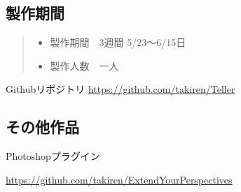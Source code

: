 \documentclass[12pt,a4paper,uplatex,dvipdfmx]{jsarticle}
\begin{document}
\subsection{製作期間}
\begin{quote}
  \begin{itemize}
    \item 製作期間　3週間 5/23～6/15日
    \item 製作人数　一人
  \end{itemize}
\end{quote}
Githubリポジトリ
\url{https://github.com/takiren/Teller}

\subsection{その他作品}
Photoshopプラグイン

\url{https://github.com/takiren/ExtendYourPerspectives}
\end{document}
